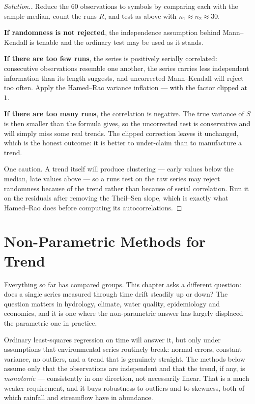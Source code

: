 \documentclass[11pt,a4paper]{article}
\theoremstyle{definition}
\newenvironment{solution}
  {\renewcommand{\qedsymbol}{}\begin{proof}[\textit{Solution}.]}
  {\end{proof}}
\begin{document}
\begin{solution}
Reduce the $60$ observations to symbols by comparing each with the sample median,
count the runs $R$, and test as above with $n_1 \approx n_2 \approx 30$.

\textbf{If randomness is not rejected}, the independence assumption behind
Mann--Kendall is tenable and the ordinary test may be used as it stands.

\textbf{If there are too few runs}, the series is positively serially correlated:
consecutive observations resemble one another, the series carries less independent
information than its length suggests, and uncorrected Mann--Kendall will reject
too often. Apply the Hamed--Rao variance inflation --- with the factor clipped at
$1$.

\textbf{If there are too many runs}, the correlation is negative. The true
variance of $S$ is then smaller than the formula gives, so the uncorrected test
is conservative and will simply miss some real trends. The clipped correction
leaves it unchanged, which is the honest outcome: it is better to under-claim
than to manufacture a trend.

One caution. A trend itself will produce clustering --- early values below the
median, late values above --- so a runs test on the raw series may reject
randomness because of the trend rather than because of serial correlation. Run it
on the residuals after removing the Theil--Sen slope, which is exactly what
Hamed--Rao does before computing its autocorrelations.
\end{solution}



\pagebreak
\section{Non-Parametric Methods for Trend}

Everything so far has compared groups. This chapter asks a different question:
does a single series measured through time drift steadily up or down? The
question matters in hydrology, climate, water quality, epidemiology and
economics, and it is one where the non-parametric answer has largely displaced
the parametric one in practice.

Ordinary least-squares regression on time will answer it, but only under
assumptions that environmental series routinely break: normal errors, constant
variance, no outliers, and a trend that is genuinely straight. The methods below
assume only that the observations are independent and that the trend, if any, is
\emph{monotonic} --- consistently in one direction, not necessarily linear. That
is a much weaker requirement, and it buys robustness to outliers and to
skewness, both of which rainfall and streamflow have in abundance.
\end{document}

